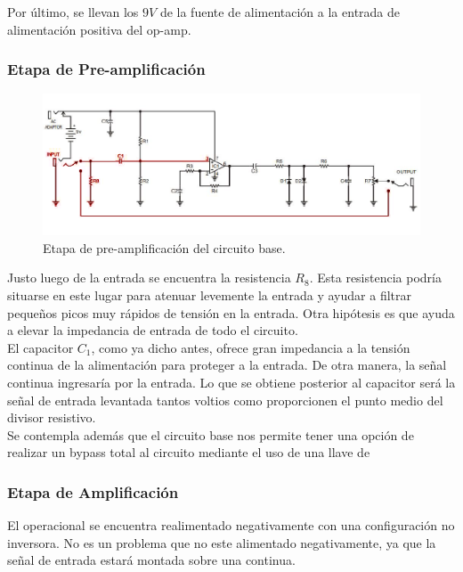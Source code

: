 Por último, se llevan los $9V$ de la fuente de alimentación a la entrada de alimentación positiva del op-amp.


\subsubsection{Etapa de Pre-amplificación}

\begin{figure}[H]
	\centering
	\includegraphics[width=1\textwidth, trim={0 0 0 0}, clip]{Ejercicio5/Imagenes/circuito_base_preamplificacion.png}
	\caption{Etapa de pre-amplificación del circuito base.}
	\label{fig:circuito_base_preamplificacion}
\end{figure}

Justo luego de la entrada se encuentra la resistencia $R_8$. Esta resistencia podría situarse en este lugar para atenuar levemente la entrada y ayudar a filtrar pequeños picos muy rápidos de tensión en la entrada. Otra hipótesis es que ayuda a elevar la impedancia de entrada de todo el circuito.\\

El capacitor $C_1$, como ya dicho antes, ofrece gran impedancia a la tensión continua de la alimentación para proteger a la entrada. De otra manera, la señal continua ingresaría por la entrada.
Lo que se obtiene posterior al capacitor será la señal de entrada levantada tantos voltios como proporcionen el punto medio del divisor resistivo.\\

Se contempla además que el circuito base nos permite tener una opción de realizar un bypass total al circuito mediante el uso de una llave de 

\subsubsection{Etapa de Amplificación}

El operacional se encuentra realimentado negativamente con una configuración no inversora. No es un problema que no este alimentado negativamente, ya que la señal de entrada estará montada sobre una continua.

